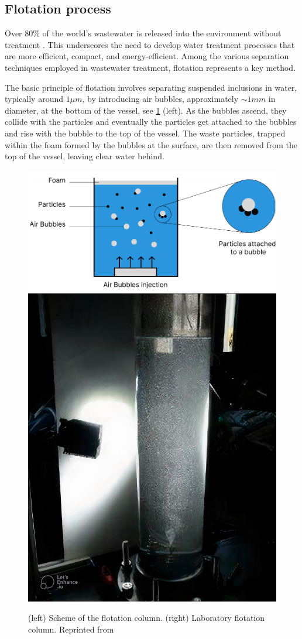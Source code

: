 \subsection{Flotation process}

Over 80\% of the world’s wastewater is released into the environment without treatment \citep{ryder2017rapport}. 
This underscores the need to develop water treatment processes that are more efficient, compact, and energy-efficient. 
Among the various separation techniques employed in wastewater treatment, flotation represents a key method. 

The basic principle of flotation involves separating suspended inclusions in water, typically around $1\mu m$, by introducing air bubbles, approximately $\sim 1 mm$ in diameter, at the bottom of the vessel, see \ref{fig:flo} (left).   
As the bubbles ascend, they collide with the particles and eventually the particles get attached to the bubbles and rise with the bubble to the top of the vessel.
The waste particles, trapped within the foam formed by the bubbles at the surface, are then removed from the top of the vessel, leaving clear water behind.  
\begin{figure}[h!]
    \centering
    \includegraphics[height=0.3\textwidth]{image/flo_scheme.png}
    \includegraphics[height=0.3\textwidth]{image/flo_LE_auto_x4.jpg}
    \caption{
        (left) Scheme of the flotation column. 
        (right) Laboratory flotation column. 
        Reprinted from \citet{landal2025}
        }
        \label{fig:flo}
\end{figure}

